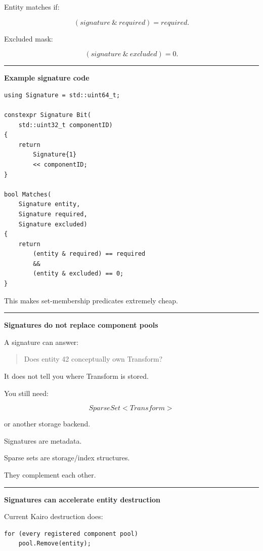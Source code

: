 Entity matches if:

\[
\boxed{
(signature\ \&\ required)=required.
}
\]

Excluded mask:

\[
(signature\ \&\ excluded)=0.
\]

\begin{center}\rule{0.5\linewidth}{0.5pt}\end{center}

\textbf{Example signature code}

\begin{verbatim}
using Signature = std::uint64_t;

constexpr Signature Bit(
    std::uint32_t componentID)
{
    return
        Signature{1}
        << componentID;
}

bool Matches(
    Signature entity,
    Signature required,
    Signature excluded)
{
    return
        (entity & required) == required
        &&
        (entity & excluded) == 0;
}
\end{verbatim}

This makes set-membership predicates extremely cheap.

\begin{center}\rule{0.5\linewidth}{0.5pt}\end{center}

\textbf{Signatures do not replace component pools}

A signature can answer:

\begin{quote}
Does entity 42 conceptually own Transform?
\end{quote}

It does not tell you where Transform is stored.

You still need:

\[
SparseSet<Transform>
\]

or another storage backend.

Signatures are metadata.

Sparse sets are storage/index structures.

They complement each other.

\begin{center}\rule{0.5\linewidth}{0.5pt}\end{center}

\textbf{Signatures can accelerate entity destruction}

Current Kairo destruction does:

\begin{verbatim}
for (every registered component pool)
    pool.Remove(entity);
\end{verbatim}

